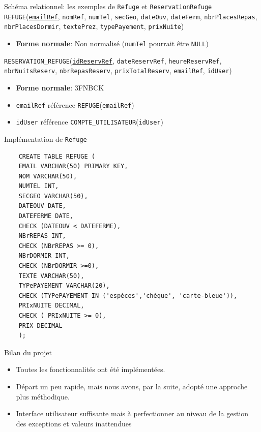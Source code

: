\documentclass{beamer}
\newcommand\att[1]{\textnhtt{#1}}
\begin{document}
\begin{frame}{Schéma relationnel: les exemples de \att{Refuge} et \att{ReservationRefuge}}
\att{REFUGE}(\att{\underline{emailRef}}, \att{nomRef}, \att{numTel}, \att{secGeo}, \att{dateOuv}, \att{dateFerm}, \att{nbrPlacesRepas}, \att{nbrPlacesDormir}, \att{textePrez}, \att{typePayement}, \att{prixNuite})
\begin{itemize}
\item \textbf{Forme normale}: Non normalisé (\att{numTel} pourrait être \att{NULL})
\end{itemize}

\att{RESERVATION\_REFUGE}(\att{\underline{idReservRef}}, \att{dateReservRef}, \att{heureReservRef}, \att{nbrNuitsReserv}, \att{nbrRepasReserv}, \att{prixTotalReserv}, \att{emailRef}, \att{idUser})
\begin{itemize}
\item \textbf{Forme normale}: 3FNBCK
\item \att{emailRef} référence \att{REFUGE}(\att{emailRef})
\item \att{idUser} référence \att{COMPTE\_UTILISATEUR}(\att{idUser})
\end{itemize}
\end{frame}

\begin{frame}[fragile]{Implémentation de \att{Refuge}}
  \begin{verbatim}
    CREATE TABLE REFUGE (
    EMAIL VARCHAR(50) PRIMARY KEY,
    NOM VARCHAR(50),
    NUMTEL INT,
    SECGEO VARCHAR(50),
    DATEOUV DATE,
    DATEFERME DATE,
    CHECK (DATEOUV < DATEFERME),
    NBrREPAS INT,
    CHECK (NBrREPAS >= 0),
    NBrDORMIR INT,
    CHECK (NBrDORMIR >=0),
    TEXTE VARCHAR(50),
    TYPePAYEMENT VARCHAR(20),
    CHECK (TYPePAYEMENT IN ('espèces','chèque', 'carte-bleue')),
    PRIxNUITE DECIMAL,
    CHECK ( PRIxNUITE >= 0),
    PRIX DECIMAL
    );
  \end{verbatim}
\end{frame}

\begin{frame}{Bilan du projet}
  \begin{itemize}
  \item Toutes les fonctionnalités ont été implémentées.
  \item Départ un peu rapide, mais nous avons, par la suite, adopté une approche plus méthodique.
  \item Interface utilisateur suffisante mais à perfectionner au niveau de la gestion des exceptions et valeurs inattendues
  \end{itemize}
\end{frame}
\end{document}
